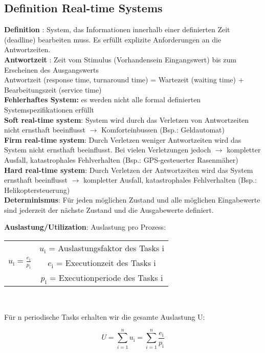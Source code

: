 \subsection{Definition Real-time Systems}
\textbf{Definition} : System, das Informationen innerhalb einer definierten Zeit
(deadline) bearbeiten muss. Es erfüllt explizite Anforderungen an die
Antwortzeiten.\\
\textbf{Antwortzeit} : Zeit vom Stimulus (Vorhandensein
Eingangswert) bis zum Erscheinen des Ausgangswerts\\
Antwortzeit (response time, turnaround time) =  Wartezeit (waiting time) + Bearbeitungszeit (service time)\\
\textbf{Fehlerhaftes System:} es werden nicht alle formal definierten Systemspezifikationen erfüllt\\
\textbf{Soft real-time system}: System wird durch das Verletzen von
Antwortzeiten nicht ernsthaft beeinflusst $\rightarrow$ Komforteinbussen (Bsp.:
Geldautomat)\\
\textbf{Firm real-time system}: Durch Verletzen weniger Antwortzeiten wird das
System nicht ernsthaft beeinflusst. Bei vielen Verletzungen jedoch $\rightarrow$
kompletter Ausfall, katastrophales Fehlverhalten (Bsp.: GPS-gesteuerter
Rasenmäher)\\
\textbf{Hard real-time system}: Durch Verletzen der Antwortzeiten wird das
System ernsthaft beeinflusst $\rightarrow$ kompletter Ausfall, katastrophales
Fehlverhalten (Bsp.: Helikoptersteuerung)\\
\textbf{Determinismus}: Für jeden möglichen Zustand und alle möglichen
Eingabewerte sind jederzeit der nächste Zustand und die Ausgabewerte definiert.

\begin{multicols}{2}
\textbf{Auslastung/Utilization}:
Auslastung pro Prozess:
\begin{center}
\begin{tabular}{c c}
& $u_\text{i}$ = Auslastungsfaktor des Tasks i\\
$u_\text{i} = \frac{e_\text{i}}{p_\text{i}}$&$e_\text{i}$ = Executionzeit des
Tasks i\\
& $p_\text{i}$ = Executionperiode des Tasks i
\end{tabular}\\
\end{center}

\columnbreak

Für n periodische Tasks erhalten wir die gesamte Auslastung U:
\begin{center}
\begin{equation}
U = \sum_{i=1}^{n}u_\text{i} = \sum_{i=1}^{n}\frac{e_\text{i}}{p_\text{i}}
\end{equation}
\end{center}
\end{multicols}
